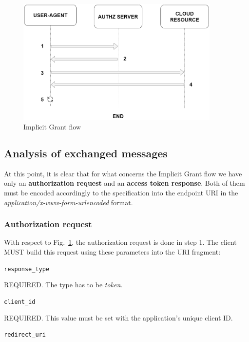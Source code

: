 \begin{figure}[htbp]
    \centering
    \includegraphics[width=0.9\textwidth]{chapters/images/chp2/implicit_flow_general.png}
    \caption{Implicit Grant flow}
    \label{fig:flowa}
\end{figure}

\vspace{1cm}

\subsection{Analysis of exchanged messages}
At this point, it is clear that for what concerns the Implicit Grant flow we have only an \textbf{authorization request} and an \textbf{access token response}. Both of them must be encoded accordingly to the specification into the endpoint URI in the \textit{application/x-www-form-urlencoded} format.

\subsubsection{Authorization request}
\label{authreq}
With respect to Fig.~\ref{fig:flowa}, the authorization request is done in step 1.
The client MUST build this request using these parameters into the URI fragment:

\texttt{response\_type}

\hspace{0.5cm}REQUIRED. The type has to be \textit{token}.

\texttt{client\_id}

\hspace{0.5cm}REQUIRED. This value must be set with the application's unique client ID.

\texttt{redirect\_uri}

